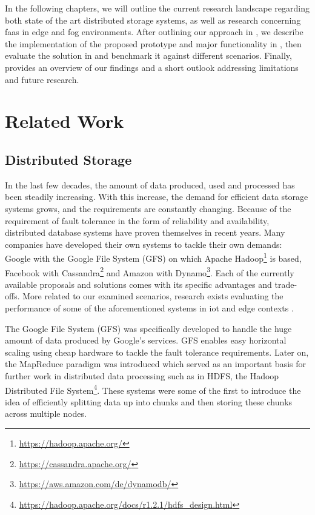\documentclass[conference]{IEEEtran}
\begin{document}
In the following chapters, we will outline the current research landscape regarding both state of the art distributed storage systems, as well as research concerning \ac{faas} in edge and fog environments. After outlining our approach in , we describe the implementation of the proposed prototype and major functionality in , then evaluate the solution in  and benchmark it against different scenarios. Finally,  provides an overview of our findings and a short outlook addressing limitations and future research.

\section{Related Work}\label{Chap:RelatedWork}
\subsection{Distributed Storage}\label{Sec:Rel_Distributed}
In the last few decades, the amount of data produced, used and processed has been steadily increasing. With this increase, the demand for efficient data storage systems grows, and the requirements are constantly changing. 
Because of the requirement of fault tolerance in the form of reliability and availability, distributed database systems have proven themselves in recent years. Many companies have developed their own systems to tackle their own demands: Google with the Google File System (GFS) on which Apache Hadoop\footnote{\url{https://hadoop.apache.org/}} is based, Facebook with Cassandra\footnote{\url{https://cassandra.apache.org/}} and Amazon with Dynamo\footnote{\url{https://aws.amazon.com/de/dynamodb/}}.  Each of the currently available proposals and solutions comes with its specific advantages and trade-offs. More related to our examined scenarios, research exists evaluating the performance of some of the aforementioned systems in \ac{iot} and edge contexts \cite{performanceinfrastructure}.

The Google File System (GFS) \cite{googlefilesystem} was specifically developed to handle the huge amount of data produced by Google's services. GFS enables easy horizontal scaling using cheap hardware to tackle the fault tolerance requirements. Later on, the MapReduce paradigm was introduced which served as an important basis for further work in distributed data processing such as in HDFS, the Hadoop Distributed File System\footnote{\url{https://hadoop.apache.org/docs/r1.2.1/hdfs_design.html}}. These systems were some of the first to introduce the idea of efficiently splitting data up into chunks and then storing these chunks across multiple nodes.
\end{document}
